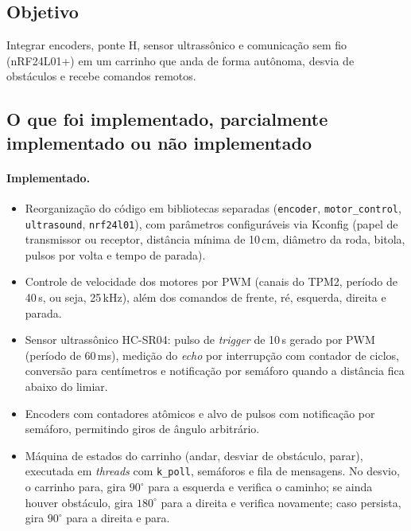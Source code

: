 \subsection*{Objetivo}
Integrar encoders, ponte H, sensor ultrassônico e comunicação sem fio (nRF24L01+) em um carrinho
que anda de forma autônoma, desvia de obstáculos e recebe comandos remotos.

\subsection{O que foi implementado, parcialmente implementado ou não implementado}

\paragraph{Implementado.}
\begin{itemize}[noitemsep]
    \item Reorganização do código em bibliotecas separadas (\texttt{encoder}, \texttt{motor\_control},
          \texttt{ultrasound}, \texttt{nrf24l01}), com parâmetros configuráveis via Kconfig
          (papel de transmissor ou receptor, distância mínima de 10\,cm, diâmetro da roda, bitola,
          pulsos por volta e tempo de parada).
    \item Controle de velocidade dos motores por PWM (canais do TPM2, período de 40\,\textmu s, ou seja, 25\,kHz),
          além dos comandos de frente, ré, esquerda, direita e parada.
    \item Sensor ultrassônico HC-SR04: pulso de \textit{trigger} de 10\,\textmu s gerado por PWM (período de 60\,ms),
          medição do \textit{echo} por interrupção com contador de ciclos, conversão para centímetros e
          notificação por semáforo quando a distância fica abaixo do limiar.
    \item Encoders com contadores atômicos e alvo de pulsos com notificação por semáforo,
          permitindo giros de ângulo arbitrário.
    \item Máquina de estados do carrinho (andar, desviar de obstáculo, parar), executada em \textit{threads}
          com \texttt{k\_poll}, semáforos e fila de mensagens. No desvio, o carrinho para, gira $90^\circ$ para a esquerda
          e verifica o caminho; se ainda houver obstáculo, gira $180^\circ$ para a direita e verifica novamente;
          caso persista, gira $90^\circ$ para a direita e para.
\end{itemize}

